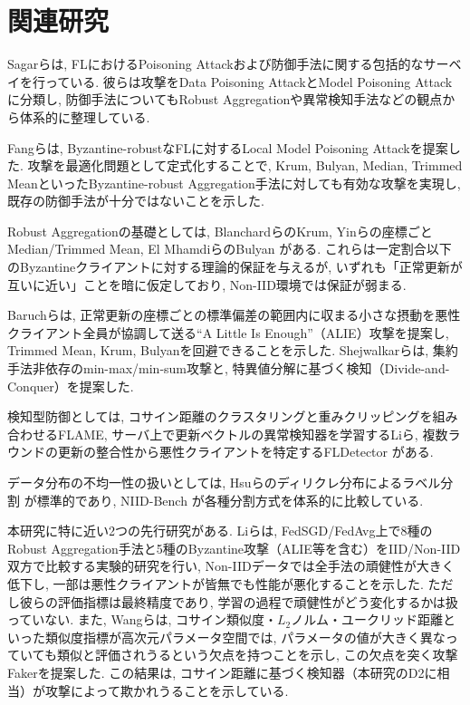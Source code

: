 \documentclass[a4j, twocolumn, dvipdfmx]{jsarticle}
\begin{document}
\section{関連研究}
\label{sec:related}

Sagarらは, FLにおけるPoisoning Attackおよび防御手法に関する包括的なサーベイを行っている. 彼らは攻撃をData Poisoning AttackとModel Poisoning Attackに分類し, 防御手法についてもRobust Aggregationや異常検知手法などの観点から体系的に整理している\cite{sagar2023survey}.

Fangらは, Byzantine-robustなFLに対するLocal Model Poisoning Attackを提案した. 攻撃を最適化問題として定式化することで, Krum, Bulyan, Median, Trimmed MeanといったByzantine-robust Aggregation手法に対しても有効な攻撃を実現し, 既存の防御手法が十分ではないことを示した\cite{fang2020local}.

Robust Aggregationの基礎としては, BlanchardらのKrum\cite{blanchard2017krum}, Yinらの座標ごとMedian/Trimmed Mean\cite{yin2018byzantine}, El MhamdiらのBulyan\cite{elmhamdi2018hidden} がある. これらは一定割合以下のByzantineクライアントに対する理論的保証を与えるが, いずれも「正常更新が互いに近い」ことを暗に仮定しており, Non-IID環境では保証が弱まる.

Baruchらは, 正常更新の座標ごとの標準偏差の範囲内に収まる小さな摂動を悪性クライアント全員が協調して送る``A Little Is Enough''（ALIE）攻撃を提案し, Trimmed Mean, Krum, Bulyanを回避できることを示した\cite{baruch2019little}. Shejwalkarらは, 集約手法非依存のmin-max/min-sum攻撃と, 特異値分解に基づく検知（Divide-and-Conquer）を提案した\cite{shejwalkar2021manipulating}.

検知型防御としては, コサイン距離のクラスタリングと重みクリッピングを組み合わせるFLAME\cite{nguyen2022flame}, サーバ上で更新ベクトルの異常検知器を学習するLiら\cite{li2020learning}, 複数ラウンドの更新の整合性から悪性クライアントを特定するFLDetector\cite{zhang2022fldetector} がある.

データ分布の不均一性の扱いとしては, Hsuらのディリクレ分布によるラベル分割\cite{hsu2019measuring} が標準的であり, NIID-Bench\cite{li2022federated} が各種分割方式を体系的に比較している.

本研究に特に近い2つの先行研究がある. Liらは, FedSGD/FedAvg上で8種のRobust Aggregation手法と5種のByzantine攻撃（ALIE等を含む）をIID/Non-IID双方で比較する実験的研究を行い, Non-IIDデータでは全手法の頑健性が大きく低下し, 一部は悪性クライアントが皆無でも性能が悪化することを示した\cite{li2023experimental}. ただし彼らの評価指標は最終精度であり, 学習の過程で頑健性がどう変化するかは扱っていない. また, Wangらは, コサイン類似度・$L_2$ノルム・ユークリッド距離といった類似度指標が高次元パラメータ空間では, パラメータの値が大きく異なっていても類似と評価されうるという欠点を持つことを示し, この欠点を突く攻撃Fakerを提案した\cite{wang2023trust}. この結果は, コサイン距離に基づく検知器（本研究のD2に相当）が攻撃によって欺かれうることを示している.
\end{document}
